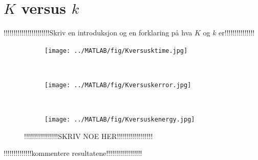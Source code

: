 \chapter{$K$ versus $k$}
!!!!!!!!!!!!!!!!!!!!!!!Skriv en introduksjon og en forklaring på hva $K$ og $k$ er!!!!!!!!!!!!!!!\\
\begin{figure}[H]
        \centering
        \begin{subfigure}[b]{0.3\textwidth}
                \texttt{[image: ../MATLAB/fig/Kversusktime.jpg]}
                \caption{  }
                \label{fig:restarttimeprob1}
        \end{subfigure}
        ~
        \begin{subfigure}[b]{0.3\textwidth}
                \texttt{[image: ../MATLAB/fig/Kversuskerror.jpg]}
                \caption{  }
                \label{fig:restarttimeprob2}
        \end{subfigure}
        ~
        \begin{subfigure}[b]{0.3\textwidth}
                \texttt{[image: ../MATLAB/fig/Kversuskenergy.jpg]}
                \caption{  }
                \label{fig:restarttimeprob2}
        \end{subfigure}
        \caption{ !!!!!!!!!!!!!!!!!SKRIV NOE HER!!!!!!!!!!!!!!!!!!  }
        \label{fig:restarttimeprob}
\end{figure}
!!!!!!!!!!!!!!kommentere resultatene!!!!!!!!!!!!!!!!!!\\

